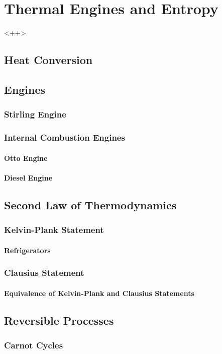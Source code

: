 \documentclass[../qm.tex]{subfiles}
\begin{document}
\chapter{Thermal Engines and Entropy}
<++>
\section{Heat Conversion}
\section{Engines}
\subsection{Stirling Engine}
\subsection{Internal Combustion Engines}
\subsubsection{Otto Engine}
\subsubsection{Diesel Engine}
\section{Second Law of Thermodynamics}
\subsection{Kelvin-Plank Statement}
\subsubsection{Refrigerators}
\subsection{Clausius Statement}
\subsubsection{Equivalence of Kelvin-Plank and Clausius Statements}
\section{Reversible Processes}
\subsection{Carnot Cycles}
\end{document}
